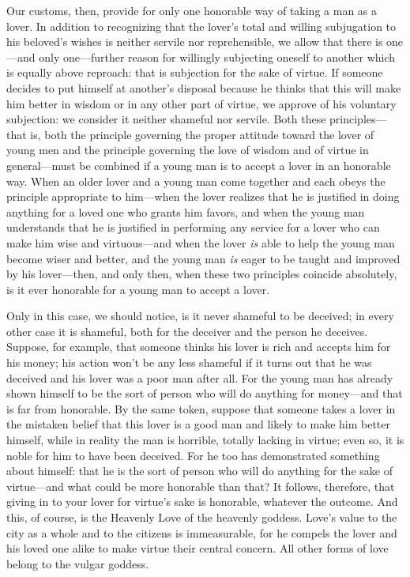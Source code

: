 Our customs, then, provide for only one honorable way of taking a man
 as a lover. In addition to recognizing that the lover's total
and willing subjugation to his beloved's wishes is neither servile nor
reprehensible, we allow that there is one---and only one---further
reason for willingly subjecting oneself to another which is equally
above reproach: that is subjection for the sake of virtue. If someone
decides to put himself at another's disposal because he thinks that this
will make him better in wisdom or in any other part of virtue, we
approve of his voluntary subjection: we consider it neither shameful nor
servile. Both these principles---that is, both the principle governing
the proper attitude toward the lover of young men and the principle
governing the love of wisdom and of  virtue in general---must be
combined if a young man is to accept a lover in an honorable way. When
an older lover and a young man come together and each obeys the
principle appropriate to him---when the lover realizes that he is
justified in doing anything for a loved one who grants him favors, and
when the young man understands that he is justified in performing any
service for a lover who can make him wise and virtuous---and when the
 lover {\em is} able to help the young man become wiser and
better, and the young man {\em is} eager to be taught and improved by
his lover---then, and only then, when these two principles coincide
absolutely, is it ever honorable for a young man to accept a lover.

Only in this case, we should notice, is it never shameful to be
deceived; in every other case it is shameful, both for the deceiver and
the person he  deceives. Suppose, for example, that
someone thinks his lover is rich and accepts him for his money; his
action won't be any less shameful if it turns out that he was deceived
and his lover was a poor man after all. For the young man has already
shown himself to be the sort of person who will do anything for
money---and that is far from honorable. By the same token, suppose that
someone takes a lover in the mistaken belief that this lover is a good
man and likely to make him better himself, while in reality the man is
horrible, totally lacking in virtue; even so, it is noble for him to
 have been deceived. For he too has demonstrated something about
himself: that he is the sort of person who will do anything for the sake
of virtue---and what could be more honorable than that? It follows,
therefore, that giving in to your lover for virtue's sake is honorable,
whatever the outcome. And this, of course, is the Heavenly Love of the
heavenly goddess. Love's value to the city as a whole and to the
citizens is immeasurable, for he compels the lover and his loved one
alike to make virtue their central  concern. All other forms of
love belong to the vulgar goddess.

